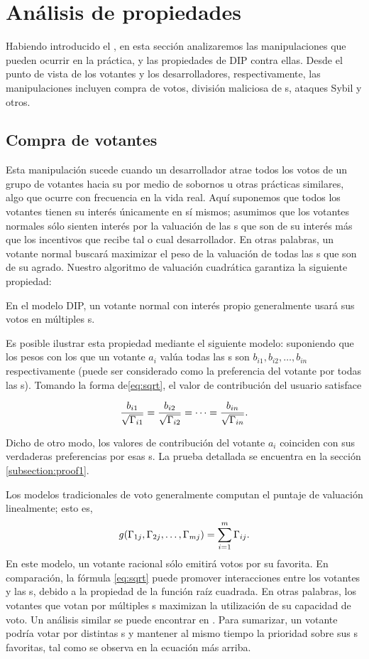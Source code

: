 \section{Análisis de propiedades}
\label{section:properties}
\noindent Habiendo introducido el \pidc, en esta sección analizaremos las manipulaciones que pueden ocurrir en la práctica, y las propiedades de DIP contra ellas\@. Desde el punto de vista de los votantes y los desarrolladores, respectivamente, las manipulaciones incluyen compra de votos, división maliciosa de {\dapp}s, ataques Sybil y otros.
\subsection{Compra de votantes}
\noindent Esta manipulación sucede cuando un desarrollador atrae todos los votos de un grupo de votantes hacia su \dapp por medio de sobornos u otras prácticas similares, algo que ocurre con frecuencia en la vida real. Aquí suponemos que todos los votantes tienen su interés únicamente en sí mismos; asumimos que los votantes normales sólo sienten interés por la valuación de las {\dapp}s que son de su interés más que los incentivos que recibe tal o cual desarrollador. En otras palabras, un votante normal buscará maximizar el peso de la valuación de todas las {\dapp}s que son de su agrado. Nuestro algoritmo de valuación cuadrática garantiza la siguiente propiedad:

\begin{property}
	\label{p1}
	En el modelo DIP, un votante normal con interés propio generalmente usará sus votos en múltiples {\dapp}s.
\end{property}
Es posible ilustrar esta propiedad mediante el siguiente modelo: suponiendo que los pesos con los que un votante $a_i$ valúa todas las {\dapp}s son $b_{i1}, b_{i2}, \ldots, b_{in}$ respectivamente (puede ser considerado como la preferencia del votante por todas las {\dapp}s). Tomando la forma de\ref{eq:sqrt}, el valor de contribución del usuario satisface

$$\frac{b_{i1}}{\sqrt{\Gamma_{i1}}}=\frac{b_{i2}}{\sqrt{\Gamma_{i2}}}=\cdots=\frac{b_{in}}{\sqrt{\Gamma_{in}}}.$$

Dicho de otro modo, los valores de contribución del votante $a_i$ coinciden con sus verdaderas preferencias por esas {\dapp}s. La prueba detallada se encuentra en la sección \ref{subsection:proof1}.

Los modelos tradicionales de voto generalmente computan el puntaje de valuación linealmente; esto es,
$$g(\Gamma_{1j},\Gamma_{2j},\ldots,\Gamma_{mj}) = \sum_{i=1}^m \Gamma_{ij}.$$
En este modelo, un votante racional sólo emitirá votos por su \dapp favorita. En comparación, la fórmula \ref{eq:sqrt} puede promover interacciones entre los votantes y las {\dapp}s, debido a la propiedad de la función raíz cuadrada. En otras palabras, los votantes que votan por múltiples {\dapp}s maximizan la utilización de su capacidad de voto. Un análisis similar se puede encontrar en \cite{buterin2018liberal}. Para sumarizar, un votante podría votar por distintas {\dapp}s y mantener al mismo tiempo la prioridad sobre sus {\dapp}s favoritas, tal como se observa en la ecuación más arriba.

